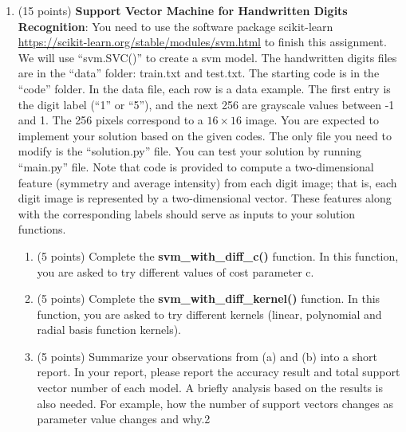 \documentclass[11pt]{article}
\begin{document}
\begin{enumerate}
\item (15 points) \textbf{Support Vector Machine for Handwritten
Digits Recognition}: You need to use the software package
scikit-learn
\href{https://scikit-learn.org/stable/modules/svm.html}{https://scikit-learn.org/stable/modules/svm.html}
to finish this assignment. We will use ``svm.SVC()'' to create a
svm model. The handwritten digits files are in the ``data''
folder: train.txt and test.txt. The starting code is in the
``code'' folder. In the data file, each row is a data example.
The first entry is the digit label (``1'' or ``5''), and the next
256 are grayscale values between -1 and 1. The 256 pixels
correspond to a $16\times16$ image. You are expected to implement
your solution based on the given codes. The only file you need to
modify is the ``solution.py'' file. You can test your solution by
running ``main.py'' file. Note that code is provided to compute a
two-dimensional feature (symmetry and average intensity) from
each digit image; that is, each digit image is represented by a
two-dimensional vector. These features along with the
corresponding labels should serve as inputs to your solution
functions.

\begin{enumerate}
\item (5 points) Complete the \textbf{svm\_with\_diff\_c()}
function. In this function, you are asked to try different values
of cost parameter c.
\item (5 points) Complete the \textbf{svm\_with\_diff\_kernel()}
function. In this function, you are asked to try different
kernels (linear, polynomial and radial basis function kernels).
\item (5 points) Summarize your observations from (a) and (b)
into a short report. In your report, please report the accuracy
result and total support vector number of each model. A briefly
analysis based on the results is also needed. For example, how
the number of support vectors changes as parameter value changes
and why.2
\end{enumerate}


\end{enumerate}
\end{document}
